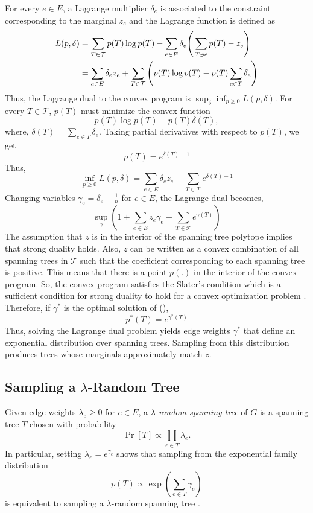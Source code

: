 \documentclass[12pt]{report}
\renewcommand{\eqref}[1]{\textup{(\textcolor{eqred}{\getrefnumber{#1}})}}
\theoremstyle{definition}
\begin{document}
For every $e \in E$, a Lagrange multiplier $\delta_e$ is associated to the constraint corresponding to the marginal $z_e$ and the Lagrange function is defined as
\begin{align}
L(p,\delta) 
&= \sum_{T \in \mathcal{T}} p(T) \log p(T) 
   - \sum_{e \in E} \delta_e \Bigg(\sum_{T \ni e} p(T) - z_e \Bigg) \notag \\
&= \sum_{e \in E} \delta_e z_e 
   + \sum_{T \in \mathcal{T}} \Bigg( p(T) \log p(T) - p(T) \sum_{e \in T} \delta_e \Bigg)
\label{lagrange}
\end{align}
Thus, the Lagrange dual to the convex program is \(\sup_{\delta} \inf_{p \geq 0} L(p,\delta)\).
For every $T \in \mathcal{T}$, $p(T)$ must minimize the convex function
\[
p(T) \log p(T) - p(T) \delta(T),
\]
where, \( \delta(T) = \sum_{e \in T} \delta_e \). Taking partial derivatives with respect to $p(T)$, we get 
\begin{equation}
    p(T) = e^{\delta(T) - 1}
    \label{exp_prob}
\end{equation}
Thus, 
\[
\inf_{p \geq 0} L(p,\delta) = \sum_{e \in E} \delta_{e} z_{e} - \sum_{T \in \mathcal{T}} e^{\delta(T) - 1}
\]
Changing variables \(\gamma_e = \delta_e - \frac{1}{n}\) for $e \in E$, the Lagrange dual becomes,
\begin{equation}
    \sup_{\gamma} \left(1 + \sum_{e \in E} z_e \gamma_e - \sum_{T \in \mathcal{T}} e^{\gamma(T)}  \right)
    \label{lagrange_dual}
\end{equation}
The assumption that $z$ is in the interior of the spanning tree polytope implies that strong duality holds. Also, $z$ can be written as a convex combination of all spanning trees in $\mathcal{T}$ such that the coefficient corresponding to each spanning tree is positive. This means that there is a point $p(.)$ in the interior of the convex program. So, the convex program satisfies the Slater's condition which is a sufficient condition for strong duality to hold for a convex optimization problem \cite{boyd2004convex}. Therefore, if $\gamma^*$ is the optimal solution of \eqref{lagrange_dual},
\begin{equation}
    p^*(T) = e^{\gamma^{*}(T)}
\end{equation}
Thus, solving the Lagrange dual problem yields edge weights $\gamma^*$ that define an exponential distribution over spanning trees. Sampling from this distribution produces trees whose marginals approximately match $z$.

\subsection[Sampling Random Trees]{Sampling a $\lambda$-Random Tree}
Given edge weights $\lambda_e \ge 0$ for $e\in E$, a 
\emph{$\lambda$-random spanning tree} of $G$ is a spanning tree $T$ chosen with probability
\[
\Pr[T] \propto \prod_{e\in T} \lambda_e .
\]
In particular, setting $\lambda_e = e^{\gamma_e}$ shows that sampling from the exponential family distribution
\[
p(T) \propto \exp\!\left(\sum_{e\in T}\gamma_e\right)
\]
is equivalent to sampling a $\lambda$-random spanning tree \cite{asadpour, Kulkarni_sampling}.
\end{document}
